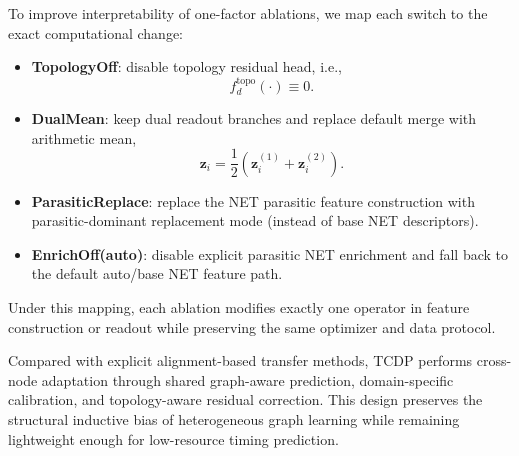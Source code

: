 \documentclass[10pt,a4paper]{article}
\begin{document}
To improve interpretability of one-factor ablations, we map each switch to the exact computational change:
\begin{itemize}
    \item \textbf{TopologyOff}: disable topology residual head, i.e.,
    \begin{equation}
        f^{\mathrm{topo}}_{d}(\cdot)\equiv 0.
    \end{equation}
    \item \textbf{DualMean}: keep dual readout branches and replace default merge with arithmetic mean,
    \begin{equation}
        \mathbf{z}_i = \frac{1}{2}\!\left(\mathbf{z}_i^{(1)}+\mathbf{z}_i^{(2)}\right).
    \end{equation}
    \item \textbf{ParasiticReplace}: replace the NET parasitic feature construction with parasitic-dominant replacement mode (instead of base NET descriptors).
    \item \textbf{EnrichOff(auto)}: disable explicit parasitic NET enrichment and fall back to the default auto/base NET feature path.
\end{itemize}
Under this mapping, each ablation modifies exactly one operator in feature construction or readout while preserving the same optimizer and data protocol.

Compared with explicit alignment-based transfer methods, TCDP performs cross-node adaptation through shared graph-aware prediction, domain-specific calibration, and topology-aware residual correction. This design preserves the structural inductive bias of heterogeneous graph learning while remaining lightweight enough for low-resource timing prediction.
\end{document}
